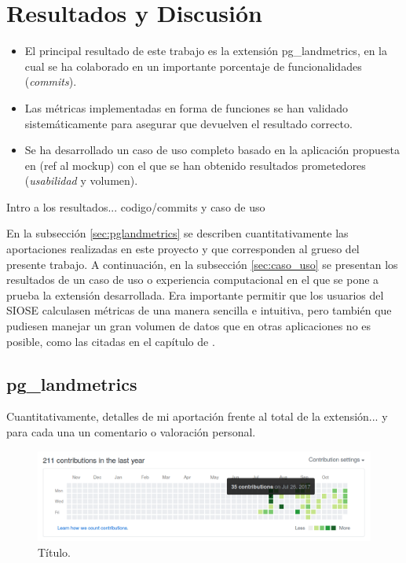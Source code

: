 \chapter{Resultados y Discusión}\label{chap:result}

\begin{graybox}
\begin{itemize}
\item El principal resultado de este trabajo es la extensión pg\_landmetrics, en la cual se ha colaborado en un importante porcentaje de funcionalidades (\textit{commits}).
\item Las métricas implementadas en forma de funciones se han validado sistemáticamente para asegurar que devuelven el resultado correcto.
\item Se ha desarrollado un caso de uso completo basado en la aplicación propuesta en (ref al mockup) con el que se han obtenido resultados prometedores (\textit{usabilidad} y volumen).
\end{itemize}
\end{graybox}

Intro a los resultados... codigo/commits y caso de uso

En la subsección \ref{sec:pglandmetrics} se describen cuantitativamente las aportaciones realizadas en este proyecto y que corresponden al grueso del presente trabajo. A continuación, en la subsección \ref{sec:caso_uso} se presentan los resultados de un caso de uso o experiencia computacional en el que se pone a prueba la extensión desarrollada. Era importante permitir que los usuarios del SIOSE calculasen métricas de una manera sencilla e intuitiva, pero también que pudiesen manejar un gran volumen de datos que en otras aplicaciones no es posible, como las citadas en el capítulo de .

\section{pg\_landmetrics \label{sec:pglandmetrics}}

Cuantitativamente, detalles de mi aportación frente al total de la extensión... y para cada una un comentario o valoración personal.

\begin{figure}
\begin{center}
\includegraphics[width=\textwidth]{ResultadosyDiscusion/Figs/contributions.png}
\caption{Título. \label{fig:contrib}}
\end{center}
\end{figure}

